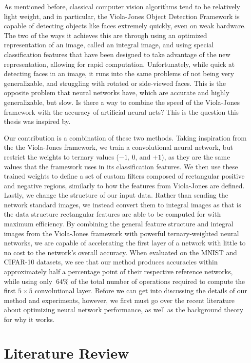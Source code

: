 \documentclass[11pt,a4paper,oldfontcommands]{memoir}
\begin{document}
As mentioned before, classical computer vision algorithms tend to be relatively light weight, and in particular, the Viola-Jones Object Detection Framework \cite{viola} is capable of detecting objects like faces extremely quickly, even on weak hardware. The two of the ways it achieves this are through using an optimized representation of an image, called an integral image, and using special classification features that have been designed to take advantage of the new representation, allowing for rapid computation. Unfortunately, while quick at detecting faces in an image, it runs into the same problems of not being very generalizable, and struggling with rotated or side-viewed faces. This is the opposite problem that neural networks have, which are accurate and highly generalizable, but slow. Is there a way to combine the speed of the Viola-Jones framework with the accuracy of artificial neural nets? This is the question this thesis was inspired by.

Our contribution is a combination of these two methods. Taking inspiration from the the Viola-Jones framework, we train a convolutional neural network, but restrict the weights to ternary values ($-1$, 0, and $+1$), as they are the same values that the framework uses in its classification features. We then use these trained weights to define a set of custom filters composed of rectangular positive and negative regions, similarly to how the features from Viola-Jones are defined. Lastly, we change the structure of our input data. Rather than sending the network standard images, we instead convert them to integral images as that is the data structure rectangular features are able to be computed for with maximum efficiency. By combining the general feature structure and integral images from the Viola-Jones framework with powerful ternary-weighted neural networks, we are capable of accelerating the first layer of a network with little to no cost to the network's overall accuracy. When evaluated on the MNIST \cite{mnist} and CIFAR-10 \cite{cifar} datasets, we see that our method produces accuracies within approximately half a percentage point of their respective reference networks, while using only $~64\%$ of the total number of operations required to compute the first $5\times5$ convolutional layer. Before we can get into discussing the details of our method and experiments, however, we first must go over the recent literature about optimizing neural network performance, as well as the background theory for why it works. 


\chapter{Literature Review}
\end{document}
